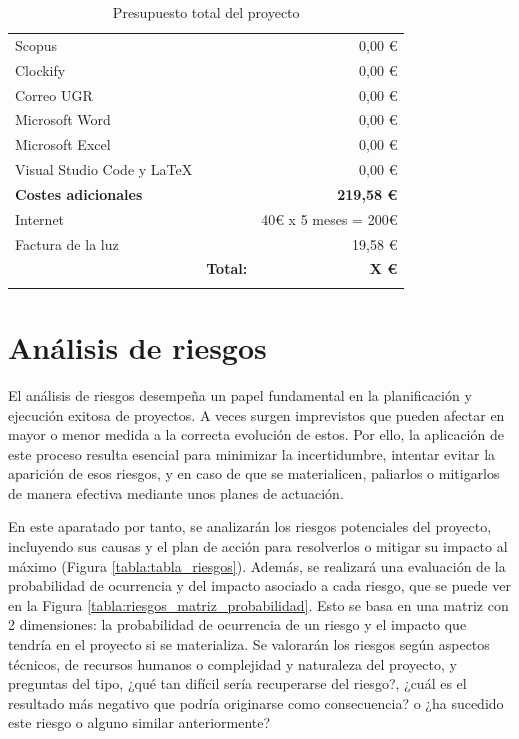 \begin{longtable}[c]{lm{2cm}r}
Scopus                                  && 0,00 €             \\
Clockify                                && 0,00 €             \\
Correo UGR                              && 0,00 €             \\
Microsoft Word                          && 0,00 €             \\
Microsoft Excel                         && 0,00 €             \\
Visual Studio Code y LaTeX              && 0,00 €             \\
\midrule
\textbf{Costes adicionales}             && \textbf{219,58 €}  \\
Internet                                && 40€ x 5 meses = 200€           \\
Factura de la luz                       && 19,58 €            \\
\midrule
  &   \multicolumn{1}{r}{\textbf{Total:}} & \textbf{X €} \\
\bottomrule
\caption{Presupuesto total del proyecto}
\label{tabla:presupuesto_total}
\end{longtable}


\section{Análisis de riesgos} \label{riesgos}
El análisis de riesgos desempeña un papel fundamental en la planificación y ejecución exitosa de proyectos. A veces surgen imprevistos que pueden afectar en mayor o menor medida a la correcta evolución de estos. Por ello, la aplicación de este proceso resulta esencial para minimizar la incertidumbre, intentar evitar la aparición de esos riesgos, y en caso de que se materialicen, paliarlos o mitigarlos de manera efectiva mediante unos planes de actuación.

En este aparatado por tanto, se analizarán los riesgos potenciales del proyecto, incluyendo sus causas y el plan de acción para resolverlos o mitigar su impacto al máximo (Figura \ref{tabla:tabla_riesgos}). Además, se realizará una evaluación de la probabilidad de ocurrencia y del impacto asociado a cada riesgo, que se puede ver en la Figura \ref{tabla:riesgos_matriz_probabilidad}. Esto se basa en una matriz con 2 dimensiones: la probabilidad de ocurrencia de un riesgo y el impacto que tendría en el proyecto si se materializa. Se valorarán los riesgos según aspectos técnicos, de recursos humanos o complejidad y naturaleza del proyecto, y preguntas del tipo, ¿qué tan difícil sería recuperarse del riesgo?, ¿cuál es el resultado más negativo que podría originarse como consecuencia? o ¿ha sucedido este riesgo o alguno similar anteriormente?

